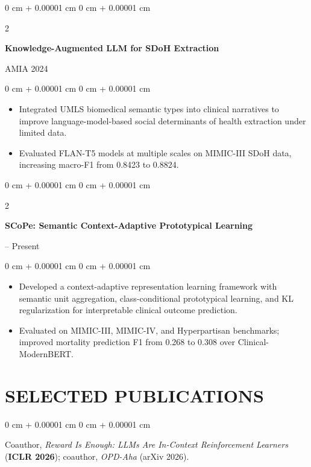 \documentclass[10pt, letterpaper]{article}
\newenvironment{highlights}{
    \begin{itemize}[
        topsep=0.03 cm,
        parsep=0.03 cm,
        partopsep=0pt,
        itemsep=0pt,
        leftmargin=0 cm + 10pt
    ]
}{
    \end{itemize}
} %
\newenvironment{onecolentry}{
    \begin{adjustwidth}{
        0 cm + 0.00001 cm
    }{
        0 cm + 0.00001 cm
    }
}{
    \end{adjustwidth}
} %
\newenvironment{twocolentry}[2][]{
    \onecolentry
    \def\secondColumn{#2}
    \setcolumnwidth{\fill, 4.5 cm}
    \begin{paracol}{2}
}{
    \switchcolumn \raggedleft \secondColumn
    \end{paracol}
    \endonecolentry
} %
\begin{document}
\begin{twocolentry}{AMIA 2024}
\textbf{Knowledge-Augmented LLM for SDoH Extraction}
\end{twocolentry}
\begin{onecolentry}
\begin{highlights}
\item Integrated UMLS biomedical semantic types into clinical narratives to improve language-model-based social determinants of health extraction under limited data.
\item Evaluated FLAN-T5 models at multiple scales on MIMIC-III SDoH data, increasing macro-F1 from 0.8423 to 0.8824.
\end{highlights}
\end{onecolentry}
\vspace{0.06 cm}

\begin{twocolentry}{2026 -- Present}
\textbf{SCoPe: Semantic Context-Adaptive Prototypical Learning}
\end{twocolentry}
\begin{onecolentry}
\begin{highlights}
\item Developed a context-adaptive representation learning framework with semantic unit aggregation, class-conditional prototypical learning, and KL regularization for interpretable clinical outcome prediction.
\item Evaluated on MIMIC-III, MIMIC-IV, and Hyperpartisan benchmarks; improved mortality prediction F1 from 0.268 to 0.308 over Clinical-ModernBERT.
\end{highlights}
\end{onecolentry}
\vspace{0.06 cm}
\section{SELECTED PUBLICATIONS}
\begin{onecolentry}
Coauthor, \textit{Reward Is Enough: LLMs Are In-Context Reinforcement Learners} (\textbf{ICLR 2026}); coauthor, \textit{OPD-Aha} (arXiv 2026).
\end{onecolentry}
\end{document}
